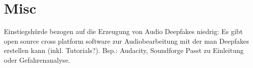 \documentclass[fontsize=11, titlepage=true, parskip=half]{scrartcl}
\begin{document}


\tableofcontents

\cleardoubleoddpage
{}




%
%
%

\section{Misc}
Einstiegshürde bezogen auf die Erzeugung von Audio Deepfakes niedrig: Es gibt open source cross platform software zur Audiobearbeitung mit der man Deepfakes erstellen kann (inkl. Tutorials?).
Bsp.: Audacity, Soundforge
Passt zu Einleitung oder Gefahrenanalyse.

\appendix



\end{document}
